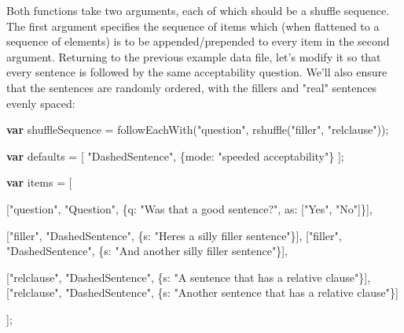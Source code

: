 \documentclass[
]{article}
\newenvironment{Shaded}{}{}
\newcommand{\DataTypeTok}[1]{\textcolor[rgb]{0.56,0.13,0.00}{#1}}
\newcommand{\FunctionTok}[1]{\textcolor[rgb]{0.02,0.16,0.49}{#1}}
\newcommand{\KeywordTok}[1]{\textcolor[rgb]{0.00,0.44,0.13}{\textbf{#1}}}
\newcommand{\NormalTok}[1]{#1}
\newcommand{\OperatorTok}[1]{\textcolor[rgb]{0.40,0.40,0.40}{#1}}
\newcommand{\StringTok}[1]{\textcolor[rgb]{0.25,0.44,0.63}{#1}}
\begin{document}
Both functions take two arguments, each of which should be a shuffle
sequence. The first argument specifies the sequence of items which (when
flattened to a sequence of elements) is to be appended/prepended to
every item in the second argument. Returning to the previous example
data file, let's modify it so that every sentence is followed by the
same acceptability question. We'll also ensure that the sentences are
randomly ordered, with the fillers and "real" sentences evenly spaced:

\begin{Shaded}
\begin{Highlighting}[]
    \KeywordTok{var}\NormalTok{ shuffleSequence }\OperatorTok{=} \FunctionTok{followEachWith}\NormalTok{(}\StringTok{"question"}\OperatorTok{,} \FunctionTok{rshuffle}\NormalTok{(}\StringTok{"filler"}\OperatorTok{,} \StringTok{"relclause"}\NormalTok{))}\OperatorTok{;}

    \KeywordTok{var}\NormalTok{ defaults }\OperatorTok{=}\NormalTok{ [}
        \StringTok{"DashedSentence"}\OperatorTok{,}\NormalTok{ \{}\DataTypeTok{mode}\OperatorTok{:} \StringTok{"speeded acceptability"}\NormalTok{\}}
\NormalTok{    ]}\OperatorTok{;}

    \KeywordTok{var}\NormalTok{ items }\OperatorTok{=}\NormalTok{ [}

\NormalTok{    [}\StringTok{"question"}\OperatorTok{,} \StringTok{"Question"}\OperatorTok{,}\NormalTok{ \{}\DataTypeTok{q}\OperatorTok{:} \StringTok{"Was that a good sentence?"}\OperatorTok{,} \DataTypeTok{as}\OperatorTok{:}\NormalTok{ [}\StringTok{"Yes"}\OperatorTok{,} \StringTok{"No"}\NormalTok{]\}]}\OperatorTok{,}

\NormalTok{    [}\StringTok{"filler"}\OperatorTok{,} \StringTok{"DashedSentence"}\OperatorTok{,}\NormalTok{ \{}\DataTypeTok{s}\OperatorTok{:} \StringTok{"Here\textquotesingle{}s a silly filler sentence"}\NormalTok{\}]}\OperatorTok{,}
\NormalTok{    [}\StringTok{"filler"}\OperatorTok{,} \StringTok{"DashedSentence"}\OperatorTok{,}\NormalTok{ \{}\DataTypeTok{s}\OperatorTok{:} \StringTok{"And another silly filler sentence"}\NormalTok{\}]}\OperatorTok{,}

\NormalTok{    [}\StringTok{"relclause"}\OperatorTok{,} \StringTok{"DashedSentence"}\OperatorTok{,}\NormalTok{ \{}\DataTypeTok{s}\OperatorTok{:} \StringTok{"A sentence that has a relative clause"}\NormalTok{\}]}\OperatorTok{,}
\NormalTok{    [}\StringTok{"relclause"}\OperatorTok{,} \StringTok{"DashedSentence"}\OperatorTok{,}\NormalTok{ \{}\DataTypeTok{s}\OperatorTok{:} \StringTok{"Another sentence that has a relative clause"}\NormalTok{\}]}

\NormalTok{    ]}\OperatorTok{;}
\end{Highlighting}
\end{Shaded}
\end{document}
